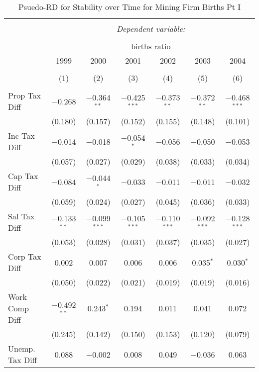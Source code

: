 
\begin{table}[!htbp] \centering 
  \caption{Psuedo-RD for Stability over Time for  Mining Firm Births Pt I} 
  \label{21year} 
\small 
\begin{tabular}{@{\extracolsep{5pt}}lcccccc} 
\\[-1.8ex]\hline 
\hline \\[-1.8ex] 
 & \multicolumn{6}{c}{\textit{Dependent variable:}} \\ 
\cline{2-7} 
\\[-1.8ex] & \multicolumn{6}{c}{births ratio} \\ 
 & 1999 & 2000 & 2001 & 2002 & 2003 & 2004 \\ 
\\[-1.8ex] & (1) & (2) & (3) & (4) & (5) & (6)\\ 
\hline \\[-1.8ex] 
 Prop Tax Diff & $-$0.268 & $-$0.364$^{**}$ & $-$0.425$^{***}$ & $-$0.373$^{**}$ & $-$0.372$^{**}$ & $-$0.468$^{***}$ \\ 
  & (0.180) & (0.157) & (0.152) & (0.155) & (0.148) & (0.101) \\ 
  Inc Tax Diff & $-$0.014 & $-$0.018 & $-$0.054$^{*}$ & $-$0.056 & $-$0.050 & $-$0.053 \\ 
  & (0.057) & (0.027) & (0.029) & (0.038) & (0.033) & (0.034) \\ 
  Cap Tax Diff & $-$0.084 & $-$0.044$^{*}$ & $-$0.033 & $-$0.011 & $-$0.011 & $-$0.032 \\ 
  & (0.059) & (0.024) & (0.027) & (0.045) & (0.036) & (0.033) \\ 
  Sal Tax Diff & $-$0.133$^{**}$ & $-$0.099$^{***}$ & $-$0.105$^{***}$ & $-$0.110$^{***}$ & $-$0.092$^{***}$ & $-$0.128$^{***}$ \\ 
  & (0.053) & (0.028) & (0.031) & (0.037) & (0.035) & (0.027) \\ 
  Corp Tax Diff & 0.002 & 0.007 & 0.006 & 0.006 & 0.035$^{*}$ & 0.030$^{*}$ \\ 
  & (0.050) & (0.022) & (0.021) & (0.019) & (0.019) & (0.016) \\ 
  Work Comp Diff & $-$0.492$^{**}$ & 0.243$^{*}$ & 0.194 & 0.011 & 0.041 & 0.072 \\ 
  & (0.245) & (0.142) & (0.150) & (0.153) & (0.120) & (0.079) \\ 
  Unemp. Tax Diff & 0.088 & $-$0.002 & 0.008 & 0.049 & $-$0.036 & 0.063 \\ 

\end{tabular}
\end{table}

